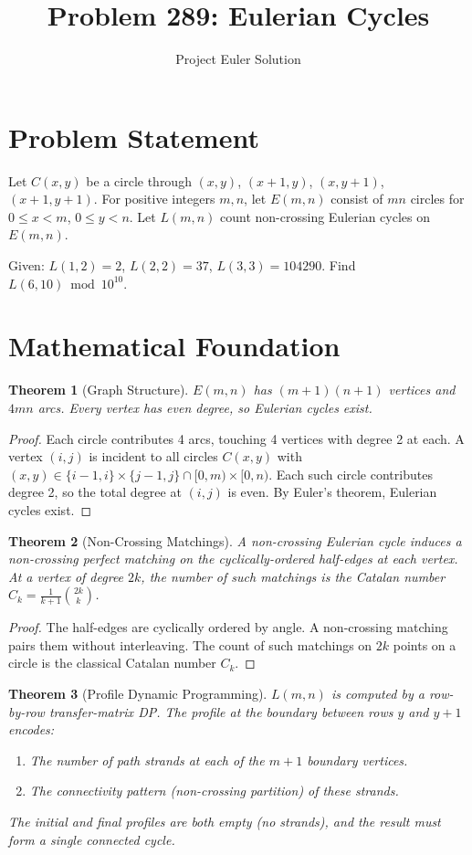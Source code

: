 \documentclass[12pt]{article}
\title{Problem 289: Eulerian Cycles}
\author{Project Euler Solution}
\date{}
\newtheorem{theorem}{Theorem}
\begin{document}
\maketitle

\section{Problem Statement}

Let $C(x,y)$ be a circle through $(x,y)$, $(x\!+\!1,y)$, $(x,y\!+\!1)$, $(x\!+\!1,y\!+\!1)$. For positive integers $m,n$, let $E(m,n)$ consist of $mn$ circles for $0 \le x < m$, $0 \le y < n$. Let $L(m,n)$ count non-crossing Eulerian cycles on $E(m,n)$.

Given: $L(1,2)=2$, $L(2,2)=37$, $L(3,3)=104290$. Find $L(6,10) \bmod 10^{10}$.

\section{Mathematical Foundation}

\begin{theorem}[Graph Structure]
$E(m,n)$ has $(m+1)(n+1)$ vertices and $4mn$ arcs. Every vertex has even degree, so Eulerian cycles exist.
\end{theorem}

\begin{proof}
Each circle contributes 4 arcs, touching 4 vertices with degree 2 at each. A vertex $(i,j)$ is incident to all circles $C(x,y)$ with $(x,y) \in \{i\!-\!1,i\}\times\{j\!-\!1,j\} \cap [0,m)\times[0,n)$. Each such circle contributes degree 2, so the total degree at $(i,j)$ is even. By Euler's theorem, Eulerian cycles exist.
\end{proof}

\begin{theorem}[Non-Crossing Matchings]
A non-crossing Eulerian cycle induces a non-crossing perfect matching on the cyclically-ordered half-edges at each vertex. At a vertex of degree $2k$, the number of such matchings is the Catalan number $C_k = \frac{1}{k+1}\binom{2k}{k}$.
\end{theorem}

\begin{proof}
The half-edges are cyclically ordered by angle. A non-crossing matching pairs them without interleaving. The count of such matchings on $2k$ points on a circle is the classical Catalan number $C_k$.
\end{proof}

\begin{theorem}[Profile Dynamic Programming]
$L(m,n)$ is computed by a row-by-row transfer-matrix DP. The profile at the boundary between rows $y$ and $y+1$ encodes:
\begin{enumerate}
\item The number of path strands at each of the $m+1$ boundary vertices.
\item The connectivity pattern (non-crossing partition) of these strands.
\end{enumerate}
The initial and final profiles are both empty (no strands), and the result must form a single connected cycle.
\end{theorem}
\end{document}
